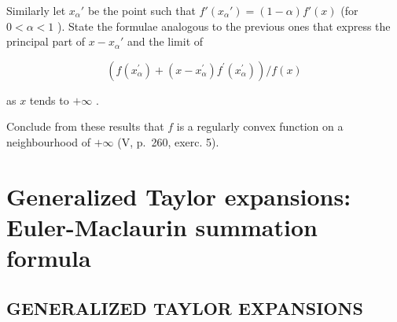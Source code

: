 Similarly let \(x_{\alpha}'\) be the point such that \(f'(x_{\alpha}') = (1 - \alpha)f'(x)\) (for \(0 < \alpha < 1\) ). State the formulae analogous to the previous ones that express the principal part of \(x - x_{\alpha}'\) and the limit of

\[
\left(f (x _ {\alpha} ^ {\prime}) + (x - x _ {\alpha} ^ {\prime}) f ^ {\prime} (x _ {\alpha} ^ {\prime})\right) / f (x)
\]

as \(x\) tends to \(+\infty\) .

Conclude from these results that \(f\) is a regularly convex function on a neighbourhood of \(+\infty\) (V, p.~260, exerc. 5).

\makeatletter
\gdef\@chapapp{\chaptername}
\makeatother
\renewcommand{\thechapter}{\Roman{chapter}}
\renewcommand{\thesection}{\S\arabic{section}}
\setcounter{chapter}{5}
\chapter{Generalized Taylor expansions: Euler-Maclaurin summation formula}

\section{GENERALIZED TAYLOR EXPANSIONS}
